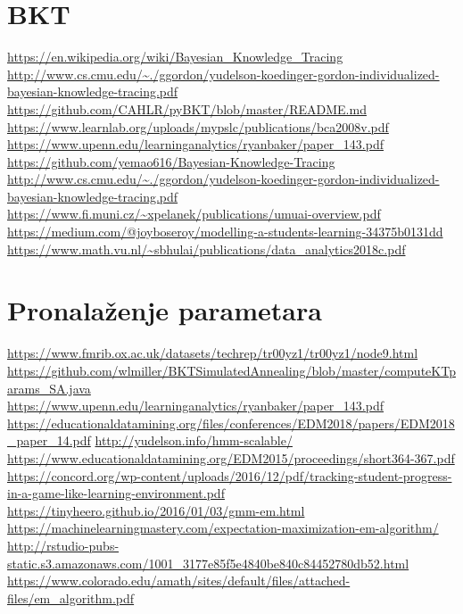 \documentclass{report}
\begin{document}
	\section{BKT}
	\url{https://en.wikipedia.org/wiki/Bayesian_Knowledge_Tracing}\newline
	\url{http://www.cs.cmu.edu/~./ggordon/yudelson-koedinger-gordon-individualized-bayesian-knowledge-tracing.pdf}\newline
	\url{https://github.com/CAHLR/pyBKT/blob/master/README.md}\newline
	\url{https://www.learnlab.org/uploads/mypslc/publications/bca2008v.pdf}\newline
	\url{https://www.upenn.edu/learninganalytics/ryanbaker/paper_143.pdf}\newline
	\url{https://github.com/yemao616/Bayesian-Knowledge-Tracing}\newline
	\url{http://www.cs.cmu.edu/~./ggordon/yudelson-koedinger-gordon-individualized-bayesian-knowledge-tracing.pdf}\newline
	\url{https://www.fi.muni.cz/~xpelanek/publications/umuai-overview.pdf}\newline
	\url{https://medium.com/@joyboseroy/modelling-a-students-learning-34375b0131dd}\newline
	\url{https://www.math.vu.nl/~sbhulai/publications/data_analytics2018c.pdf}\newline
	\section{Pronalaženje parametara}
	\url{https://www.fmrib.ox.ac.uk/datasets/techrep/tr00yz1/tr00yz1/node9.html}\newline
	\url{https://github.com/wlmiller/BKTSimulatedAnnealing/blob/master/computeKTparams_SA.java}\newline
	\url{https://www.upenn.edu/learninganalytics/ryanbaker/paper_143.pdf}\newline
	\url{https://educationaldatamining.org/files/conferences/EDM2018/papers/EDM2018_paper_14.pdf}\newline
	\url{http://yudelson.info/hmm-scalable/}\newline
	\url{https://www.educationaldatamining.org/EDM2015/proceedings/short364-367.pdf}\newline
	\url{https://concord.org/wp-content/uploads/2016/12/pdf/tracking-student-progress-in-a-game-like-learning-environment.pdf}\newline
	\url{https://tinyheero.github.io/2016/01/03/gmm-em.html}\newline
	\url{https://machinelearningmastery.com/expectation-maximization-em-algorithm/}\newline
	\url{http://rstudio-pubs-static.s3.amazonaws.com/1001_3177e85f5e4840be840c84452780db52.html}\newline
	\url{https://www.colorado.edu/amath/sites/default/files/attached-files/em_algorithm.pdf}
\end{document}
